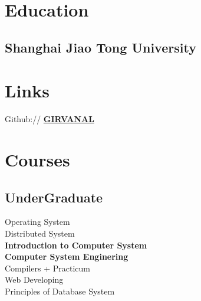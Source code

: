 \documentclass[]{deedy-resume-openfont}
\begin{document}
%
%
\lastupdated

%
%

%
%

\begin{minipage}[t]{0.3\textwidth} 


\section{Education} 


\subsection{Shanghai Jiao Tong University}
\sectionsep


\section{Links}
\sectionsep
  
Github:// \href{https://github.com/GIRVANAL}{\bf GIRVANAL} \\

\section{Courses}
\sectionsep
\subsection{UnderGraduate}
Operating System \\
Distributed System \\
\textbf{Introduction to Computer System} \\
\textbf{Computer System Enginering} \\
Compilers + Practicum \\
Web Developing \\
Principles of Database System  \\
\sectionsep


\end{minipage}
\end{document}
